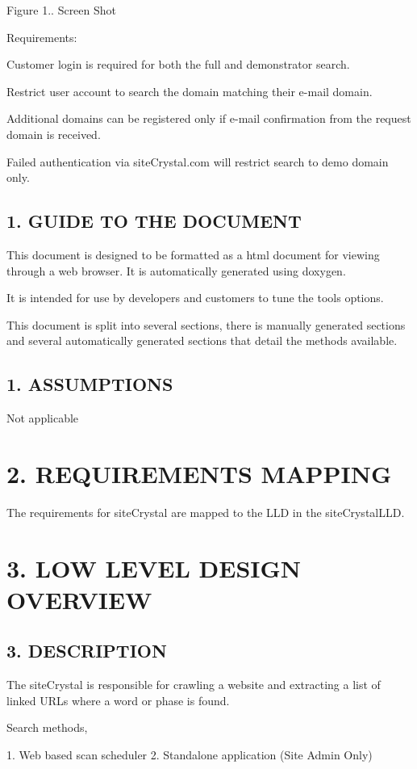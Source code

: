  Figure 1.. Screen Shot

Requirements\+:
\begin{DoxyEnumerate}
\item Customer login is required for both the full and demonstrator search.
\item Restrict user account to search the domain matching their e-\/mail domain.
\item Additional domains can be registered only if e-\/mail confirmation from the request domain is received.
\item Failed authentication via site\+Crystal.\+com will restrict search to demo domain only.
\end{DoxyEnumerate}\hypertarget{index_sec_1_2}{}\subsection{1. G\+U\+I\+D\+E T\+O T\+H\+E D\+O\+C\+U\+M\+E\+N\+T}\label{index_sec_1_2}
\begin{DoxyVerb}This document is designed to be formatted as a html document for viewing through
a web browser. It is automatically generated using doxygen.

It is intended for use by developers and customers to tune the tools options.

This document is split into several sections, there is manually generated sections
and several automatically generated sections that detail the methods available.
\end{DoxyVerb}
\hypertarget{index_sec_1_3}{}\subsection{1.	\+A\+S\+S\+U\+M\+P\+T\+I\+O\+N\+S}\label{index_sec_1_3}
\begin{DoxyVerb}Not applicable
\end{DoxyVerb}
\hypertarget{index_sec_2}{}\section{2.	\+R\+E\+Q\+U\+I\+R\+E\+M\+E\+N\+T\+S M\+A\+P\+P\+I\+N\+G}\label{index_sec_2}
The requirements for site\+Crystal are mapped to the L\+L\+D in the site\+Crystal\+L\+L\+D.\hypertarget{index_sec_3}{}\section{3.	\+L\+O\+W L\+E\+V\+E\+L D\+E\+S\+I\+G\+N O\+V\+E\+R\+V\+I\+E\+W}\label{index_sec_3}
\hypertarget{index_sec_3_1}{}\subsection{3.	\+D\+E\+S\+C\+R\+I\+P\+T\+I\+O\+N}\label{index_sec_3_1}
\begin{DoxyVerb}The siteCrystal is responsible for crawling a website and extracting a list of linked URLs where a word or phase is found.

Search methods,

    1. Web based scan scheduler 
    2. Standalone application (Site Admin Only)
\end{DoxyVerb}



